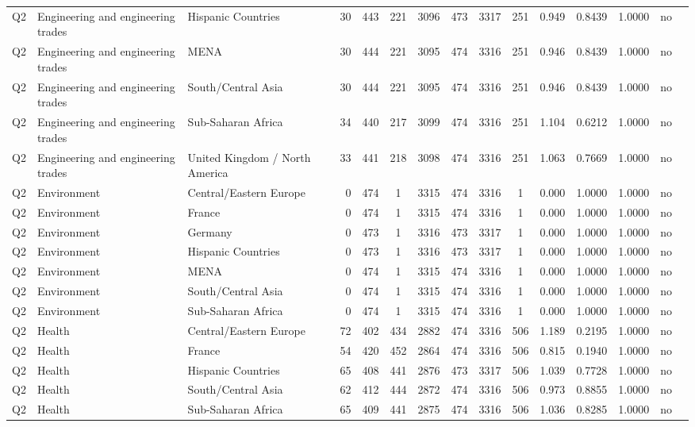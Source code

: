 \begin{longtable}{lllrcccccccccll}
Q2 & Engineering and engineering trades & Hispanic Countries & 30 & 443 & 221 & 3096 & 473 & 3317 & 251 & 0.949 & 0.8439 & 1.0000 & no \\
Q2 & Engineering and engineering trades & MENA & 30 & 444 & 221 & 3095 & 474 & 3316 & 251 & 0.946 & 0.8439 & 1.0000 & no \\
Q2 & Engineering and engineering trades & South/Central Asia & 30 & 444 & 221 & 3095 & 474 & 3316 & 251 & 0.946 & 0.8439 & 1.0000 & no \\
Q2 & Engineering and engineering trades & Sub-Saharan Africa & 34 & 440 & 217 & 3099 & 474 & 3316 & 251 & 1.104 & 0.6212 & 1.0000 & no \\
Q2 & Engineering and engineering trades & United Kingdom / North America & 33 & 441 & 218 & 3098 & 474 & 3316 & 251 & 1.063 & 0.7669 & 1.0000 & no \\
Q2 & Environment & Central/Eastern Europe & 0 & 474 & 1 & 3315 & 474 & 3316 & 1 & 0.000 & 1.0000 & 1.0000 & no \\
Q2 & Environment & France & 0 & 474 & 1 & 3315 & 474 & 3316 & 1 & 0.000 & 1.0000 & 1.0000 & no \\
Q2 & Environment & Germany & 0 & 473 & 1 & 3316 & 473 & 3317 & 1 & 0.000 & 1.0000 & 1.0000 & no \\
Q2 & Environment & Hispanic Countries & 0 & 473 & 1 & 3316 & 473 & 3317 & 1 & 0.000 & 1.0000 & 1.0000 & no \\
Q2 & Environment & MENA & 0 & 474 & 1 & 3315 & 474 & 3316 & 1 & 0.000 & 1.0000 & 1.0000 & no \\
Q2 & Environment & South/Central Asia & 0 & 474 & 1 & 3315 & 474 & 3316 & 1 & 0.000 & 1.0000 & 1.0000 & no \\
Q2 & Environment & Sub-Saharan Africa & 0 & 474 & 1 & 3315 & 474 & 3316 & 1 & 0.000 & 1.0000 & 1.0000 & no \\
Q2 & Health & Central/Eastern Europe & 72 & 402 & 434 & 2882 & 474 & 3316 & 506 & 1.189 & 0.2195 & 1.0000 & no \\
Q2 & Health & France & 54 & 420 & 452 & 2864 & 474 & 3316 & 506 & 0.815 & 0.1940 & 1.0000 & no \\
Q2 & Health & Hispanic Countries & 65 & 408 & 441 & 2876 & 473 & 3317 & 506 & 1.039 & 0.7728 & 1.0000 & no \\
Q2 & Health & South/Central Asia & 62 & 412 & 444 & 2872 & 474 & 3316 & 506 & 0.973 & 0.8855 & 1.0000 & no \\
Q2 & Health & Sub-Saharan Africa & 65 & 409 & 441 & 2875 & 474 & 3316 & 506 & 1.036 & 0.8285 & 1.0000 & no \\

\end{longtable}
